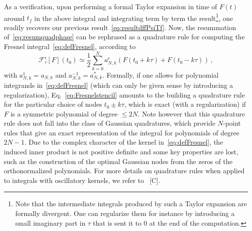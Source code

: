 \documentclass[aps,showpacs,twocolumn,
prd,superscriptaddress,nofootinbib]{revtex4-1}
\newcommand{\be}{\begin{equation}}
\newcommand{\ee}{\end{equation}}
\newcommand\ud{{\mathrm{d}}}
\newcommand\calF{{\mathcal{F}}}
\newcommand{\tf}{t_{f}}
\newcommand{\SM}[1]{{\color{Red} #1}}
\begin{document}
As a verification, upon performing a formal Taylor expansion in time of $F(t)$ around $\tf$ in the above integral and integrating term by term the result\footnote{Note that the intermediate integrals produced by such a Taylor expansion are formally divergent. One can regularize them for instance by introducing a small imaginary part in $\tau$ that is sent it to $0$ at the end of the computation.}, one readily recovers our previous result~\eqref{eq:resultdffPsiTf}. Now, the resummation of~\eqref{eq:resumquadphase} can be rephrased as a quadrature rule for computing the Fresnel integral~\eqref{eq:defFresnel}, according to
\be\label{eq:Fresnelstencil}
	\calF_{\tau}^{\epsilon} [F](t_{0}) \simeq \frac{1}{2} \sum\limits_{k=0}^{N} a_{N,k}^{\epsilon} \left( F(t_{0} + k\tau) + F(t_{0} - k\tau) \right)\,,
\ee
with $a_{N,k}^{1} = a_{N,k}$ and $a_{N,k}^{-1} = a_{N,k}^{*}$. Formally, if one allows for polynomial integrands in~\eqref{eq:defFresnel} (which can only be given sense by introducing a regularization), Eq.~\eqref{eq:Fresnelstencil} amounts to the building a quadrature rule for the particular choice of nodes $t_{0} \pm k \tau$, which is exact (with a regularization) if $F$ is a symmetric polynomial of degree $\leq 2N$. Note however that this quadrature rule does not fall into the class of Gaussian quadratures, which provide $N$-point rules that give an exact representation of the integral for polynomials of degree $2N-1$. Due to the complex character of the kernel in~\eqref{eq:defFresnel}, the induced inner product is not positive definite and some key properties are lost, such as the construction of the optimal Gaussian nodes from the zeros of the orthonormalized polynomials. For more details on quadrature rules when applied to integrals with oscillatory kernels, we refer to~\cite{} \SM{[C]}.

\end{document}
